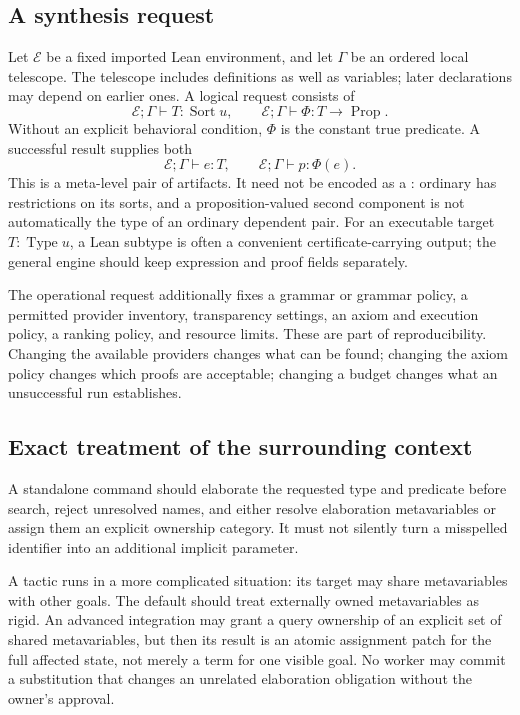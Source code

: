 \documentclass[11pt,letterpaper]{article}
\newcommand{\id}[1]{\texttt{\detokenize{#1}}}
\newcommand{\Spec}{\Phi}
\newcommand{\Ctx}{\Gamma}
\newcommand{\Env}{\mathcal E}
\newcommand{\pr}{\operatorname{Prop}}
\newcommand{\ty}{\operatorname{Type}}
\newcommand{\sort}{\operatorname{Sort}}
\theoremstyle{definition}
\theoremstyle{remark}
\begin{document}
\subsection{A synthesis request}

Let $\Env$ be a fixed imported Lean environment, and let $\Ctx$ be an ordered local telescope. The telescope includes definitions as well as variables; later declarations may depend on earlier ones. A logical request consists of
\[
 \Env;\Ctx \vdash T : \sort u,
 \qquad
 \Env;\Ctx \vdash \Spec : T \to \pr.
\]
Without an explicit behavioral condition, $\Spec$ is the constant true predicate. A successful result supplies both
\begin{equation}
 \Env;\Ctx\vdash e:T,
 \qquad
 \Env;\Ctx\vdash p:\Spec(e).
 \label{eq:success}
\end{equation}
This is a meta-level pair of artifacts. It need not be encoded as a \id{Sigma}: ordinary \id{Sigma} has restrictions on its sorts, and a proposition-valued second component is not automatically the type of an ordinary dependent pair. For an executable target $T:\ty u$, a Lean subtype is often a convenient certificate-carrying output; the general engine should keep expression and proof fields separately.

The operational request additionally fixes a grammar or grammar policy, a permitted provider inventory, transparency settings, an axiom and execution policy, a ranking policy, and resource limits. These are part of reproducibility. Changing the available providers changes what can be found; changing the axiom policy changes which proofs are acceptable; changing a budget changes what an unsuccessful run establishes.

\subsection{Exact treatment of the surrounding context}

A standalone command should elaborate the requested type and predicate before search, reject unresolved names, and either resolve elaboration metavariables or assign them an explicit ownership category. It must not silently turn a misspelled identifier into an additional implicit parameter.

A tactic runs in a more complicated situation: its target may share metavariables with other goals. The default should treat externally owned metavariables as rigid. An advanced integration may grant a query ownership of an explicit set of shared metavariables, but then its result is an atomic assignment patch for the full affected state, not merely a term for one visible goal. No worker may commit a substitution that changes an unrelated elaboration obligation without the owner's approval.
\end{document}
